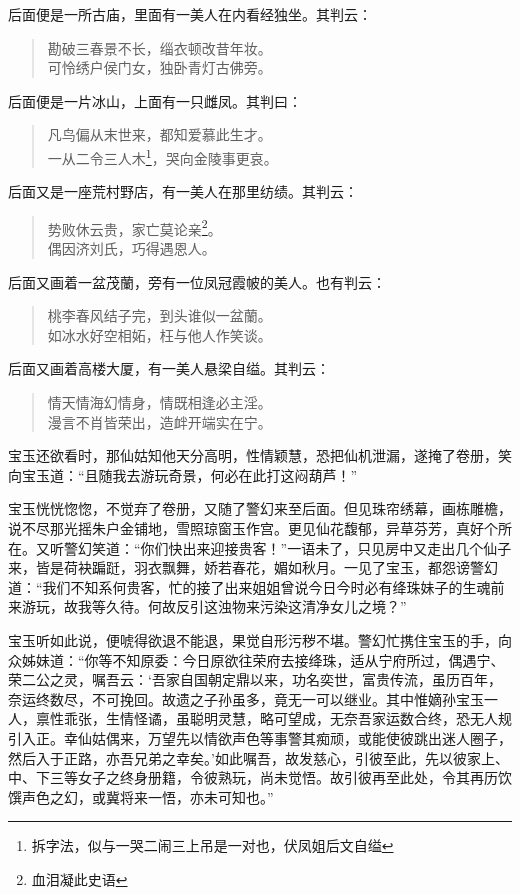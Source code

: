 \documentclass[12pt,oneside]{book}
\newenvironment{shici}{%
\begin{verse}%
\centering\large\hspace{12pt}}%
{\end{verse}}
\begin{document}
后面便是一所古庙，里面有一美人在内看经独坐。其判云：

\begin{shici}
勘破三春景不长，缁衣顿改昔年妆。\\
可怜绣户侯门女，独卧青灯古佛旁。
\end{shici}


后面便是一片冰山，上面有一只雌凤。其判曰：

\begin{shici}
凡鸟偏从末世来，都知爱慕此生才。\\
一从二令三人木\footnote{拆字法，似与一哭二闹三上吊是一对也，伏凤姐后文自缢}，哭向金陵事更哀。
\end{shici}


后面又是一座荒村野店，有一美人在那里纺绩。其判云：

\begin{shici}
势败休云贵，家亡莫论亲\footnote{血泪凝此史语}。\\
偶因济刘氏，巧得遇恩人。
\end{shici}

后面又画着一盆茂蘭，旁有一位凤冠霞帔的美人。也有判云：

\begin{shici}
桃李春风结子完，到头谁似一盆蘭。\\
如冰水好空相妬，枉与他人作笑谈。
\end{shici}


后面又画着高楼大厦，有一美人悬梁自缢。其判云：

\begin{shici}
情天情海幻情身，情既相逢必主淫。\\
漫言不肖皆荣出，造衅开端实在宁。
\end{shici}


宝玉还欲看时，那仙姑知他天分高明，性情颖慧，恐把仙机泄漏，遂掩了卷册，笑向宝玉道：“且随我去游玩奇景，何必在此打这闷葫芦！”

宝玉恍恍惚惚，不觉弃了卷册，又随了警幻来至后面。但见珠帘绣幕，画栋雕檐，说不尽那光摇朱户金铺地，雪照琼窗玉作宫。更见仙花馥郁，异草芬芳，真好个所在。又听警幻笑道：“你们快出来迎接贵客！”一语未了，只见房中又走出几个仙子来，皆是荷袂蹁跹，羽衣飘舞，娇若春花，媚如秋月。一见了宝玉，都怨谤警幻道：“我们不知系何贵客，忙的接了出来姐姐曾说今日今时必有绛珠妹子的生魂前来游玩，故我等久待。何故反引这浊物来污染这清净女儿之境？”

宝玉听如此说，便唬得欲退不能退，果觉自形污秽不堪。警幻忙携住宝玉的手，向众姊妹道：“你等不知原委：今日原欲往荣府去接绛珠，适从宁府所过，偶遇宁、荣二公之灵，嘱吾云：‘吾家自国朝定鼎以来，功名奕世，富贵传流，虽历百年，奈运终数尽，不可挽回。故遗之子孙虽多，竟无一可以继业。其中惟嫡孙宝玉一人，禀性乖张，生情怪谲，虽聪明灵慧，略可望成，无奈吾家运数合终，恐无人规引入正。幸仙姑偶来，万望先以情欲声色等事警其痴顽，或能使彼跳出迷人圈子，然后入于正路，亦吾兄弟之幸矣。’如此嘱吾，故发慈心，引彼至此，先以彼家上、中、下三等女子之终身册籍，令彼熟玩，尚未觉悟。故引彼再至此处，令其再历饮馔声色之幻，或冀将来一悟，亦未可知也。”
\end{document}
